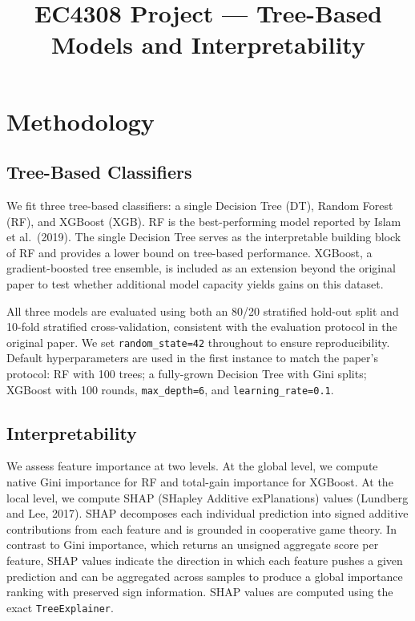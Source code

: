 \documentclass[11pt]{article}
\title{EC4308 Project --- Tree-Based Models and Interpretability}
\author{}
\date{}
\begin{document}
\maketitle


\section*{Methodology}

\subsection*{Tree-Based Classifiers}

We fit three tree-based classifiers: a single Decision Tree (DT), Random
Forest (RF), and XGBoost (XGB). RF is the best-performing model reported by
Islam et al.\ (2019). The single Decision Tree serves as the interpretable
building block of RF and provides a lower bound on tree-based performance.
XGBoost, a gradient-boosted tree ensemble, is included as an extension beyond
the original paper to test whether additional model capacity yields gains on
this dataset.

All three models are evaluated using both an 80/20 stratified hold-out split
and 10-fold stratified cross-validation, consistent with the evaluation
protocol in the original paper. We set \texttt{random\_state=42} throughout
to ensure reproducibility. Default hyperparameters are used in the first
instance to match the paper's protocol: RF with 100 trees; a fully-grown
Decision Tree with Gini splits; XGBoost with 100 rounds,
\texttt{max\_depth=6}, and \texttt{learning\_rate=0.1}.

\subsection*{Interpretability}

We assess feature importance at two levels. At the global level, we compute
native Gini importance for RF and total-gain importance for XGBoost. At the
local level, we compute SHAP (SHapley Additive exPlanations) values
(Lundberg and Lee, 2017). SHAP decomposes each individual prediction into
signed additive contributions from each feature and is grounded in
cooperative game theory. In contrast to Gini importance, which returns an
unsigned aggregate score per feature, SHAP values indicate the direction in
which each feature pushes a given prediction and can be aggregated across
samples to produce a global importance ranking with preserved sign
information. SHAP values are computed using the exact \texttt{TreeExplainer}.
\end{document}
